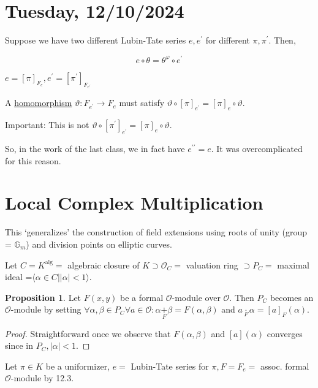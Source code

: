 \documentclass[openany]{amsbook}
\numberwithin{section}{chapter}
\theoremstyle{definition}
\newtheorem{proposition}[theorem]{Proposition}
\begin{document}
\section*{Tuesday, 12/10/2024}

Suppose we have two different Lubin-Tate series \(e,e^{\prime}\) for different \(\pi,\pi ^{\prime} \). Then,

\[
    e \circ \theta = \theta ^\varphi \circ e^{\prime}
\]

\(e = [\pi]_{F_e}, e^{\prime} = [\pi^{\prime}]_{F_{e^{\prime}}}\)

A \underline{homomorphism} \(\vartheta : F_{e^{\prime}} \to F_e\) must satisfy \(\vartheta \circ [\pi]_{e^{\prime}} = [\pi]_e \circ \vartheta\).

Important: This is not \(\vartheta \circ [\pi^{\prime}]_{e^{\prime}} = [\pi]_e \circ \vartheta\).

So, in the work of the last class, we in fact have \(e^{\prime\prime} = e\). It was overcomplicated for this reason.

\section{Local Complex Multiplication}

This `generalizes' the construction of field extensions using roots of unity (group = \(\mathbb{G}_m\)) and division points on elliptic curves.

Let \(C = K^{\operatorname{alg}} =\) algebraic closure of \(K \supset \mathcal{O} _C =\) valuation ring \(\supset P_C =\) maximal ideal =\( \langle \alpha \in C \mid \vert \alpha \vert < 1 \rangle\).

\begin{proposition}
    Let \(F(x,y)\) be a formal \(\mathcal{O}\)-module over \(\mathcal{O}\). Then \(P_C\) becomes an \(\mathcal{O}\)-module by setting \(\forall \alpha, \beta \in P_C \forall a\in \mathcal{O}: \alpha \underset{F}{+} \beta = F(\alpha ,\beta)\) and \(a \underset{F}{\cdot} \alpha = [a]_F (\alpha)\).
\end{proposition}

\begin{proof}
    Straightforward once we observe that \(F(\alpha , \beta)\) and \([a](\alpha)\) converges since in \(P_C, \vert \alpha \vert < 1\).
\end{proof}

Let \(\pi \in K\) be a uniformizer, \(e =\) Lubin-Tate series for \(\pi, F = F_e =\) assoc. formal \(\mathcal{O}\)-module by 12.3.
    
\end{document}
